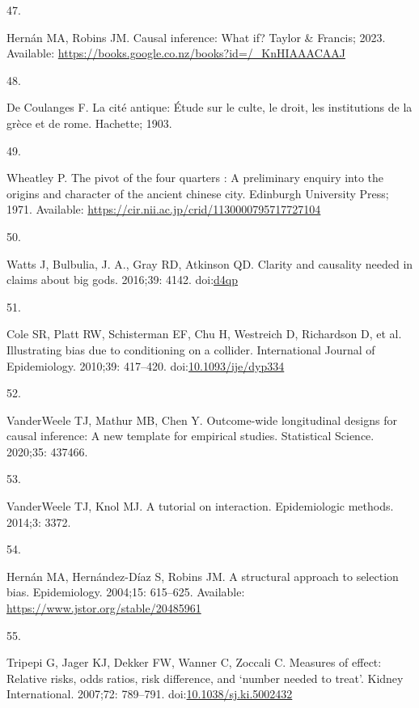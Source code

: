 \documentclass[
  singlecolumn]{article}
\newlength{\cslhangindent}
\newlength{\csllabelwidth}
\newlength{\cslentryspacingunit} %
\newenvironment{CSLReferences}[2] %
 {%
  \setlength{\parindent}{0pt}
  \ifodd #1
  \let\oldpar\par
  \def\par{\hangindent=\cslhangindent\oldpar}
  \fi
  \setlength{\parskip}{#2\cslentryspacingunit}
 }%
 {}
\newcommand{\CSLLeftMargin}[1]{\parbox[t]{\csllabelwidth}{#1}}
\newcommand{\CSLRightInline}[1]{\parbox[t]{\linewidth - \csllabelwidth}{#1}\break}
\begin{document}
\begin{CSLReferences}{0}{0}
\leavevmode{}%
\CSLLeftMargin{47. }%
\CSLRightInline{Hernán MA, Robins JM. Causal inference: What if? Taylor
\& Francis; 2023. Available:
\url{https://books.google.co.nz/books?id=/_KnHIAAACAAJ}}

\leavevmode{}%
\CSLLeftMargin{48. }%
\CSLRightInline{De Coulanges F. La cité antique: Étude sur le culte, le
droit, les institutions de la grèce et de rome. Hachette; 1903. }

\leavevmode{}%
\CSLLeftMargin{49. }%
\CSLRightInline{Wheatley P. The pivot of the four quarters : A
preliminary enquiry into the origins and character of the ancient
chinese city. Edinburgh University Press; 1971. Available:
\url{https://cir.nii.ac.jp/crid/1130000795717727104}}

\leavevmode{}%
\CSLLeftMargin{50. }%
\CSLRightInline{Watts J, Bulbulia, J. A., Gray RD, Atkinson QD. Clarity
and causality needed in claims about big gods. 2016;39: 4142.
doi:\href{https://doi.org/d4qp}{d4qp}}

\leavevmode{}%
\CSLLeftMargin{51. }%
\CSLRightInline{Cole SR, Platt RW, Schisterman EF, Chu H, Westreich D,
Richardson D, et al. Illustrating bias due to conditioning on a
collider. International Journal of Epidemiology. 2010;39: 417--420.
doi:\href{https://doi.org/10.1093/ije/dyp334}{10.1093/ije/dyp334}}

\leavevmode{}%
\CSLLeftMargin{52. }%
\CSLRightInline{VanderWeele TJ, Mathur MB, Chen Y. Outcome-wide
longitudinal designs for causal inference: A new template for empirical
studies. Statistical Science. 2020;35: 437466. }

\leavevmode{}%
\CSLLeftMargin{53. }%
\CSLRightInline{VanderWeele TJ, Knol MJ. A tutorial on interaction.
Epidemiologic methods. 2014;3: 3372. }

\leavevmode{}%
\CSLLeftMargin{54. }%
\CSLRightInline{Hernán MA, Hernández-Díaz S, Robins JM. A structural
approach to selection bias. Epidemiology. 2004;15: 615--625. Available:
\url{https://www.jstor.org/stable/20485961}}

\leavevmode{}%
\CSLLeftMargin{55. }%
\CSLRightInline{Tripepi G, Jager KJ, Dekker FW, Wanner C, Zoccali C.
Measures of effect: Relative risks, odds ratios, risk difference, and
{`}number needed to treat{'}. Kidney International. 2007;72: 789--791.
doi:\href{https://doi.org/10.1038/sj.ki.5002432}{10.1038/sj.ki.5002432}}


\end{CSLReferences}
\end{document}
